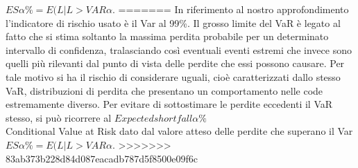 \documentclass[titlepage]{article}
\begin{document}
\begin{itemize}
{$ES\alpha\%=E(L|L>VAR\alpha%
$.
=======
In riferimento al nostro approfondimento l’indicatore di rischio usato è il Var al 99\%. Il grosso limite del VaR è legato al fatto che si stima soltanto la massima perdita probabile per un determinato intervallo di confidenza, tralasciando così eventuali eventi estremi che invece sono quelli più rilevanti dal punto di vista delle perdite che essi possono causare. Per tale motivo si ha il rischio di considerare uguali, cioè caratterizzati dallo stesso VaR, distribuzioni di perdita che presentano un comportamento nelle code estremamente diverso. Per evitare di sottostimare le perdite eccedenti il VaR stesso, si può ricorrere al $Expected shortfall\alpha\%$ \\  Conditional Value at Risk dato dal valore atteso delle perdite che superano il Var
$ES\alpha\%=E(L|L>VAR\alpha%
$.
>>>>>>> 83ab373b228d84d087eacadb787d5f8500e09f6c




}
\end{itemize}
\end{document}
